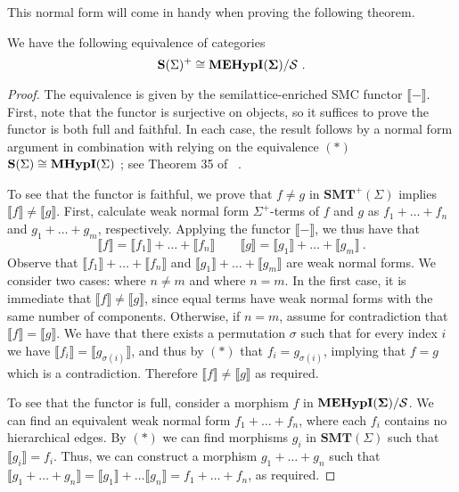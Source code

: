 This normal form will come in handy when proving the following theorem.

\begin{theorem}
\label{thm:completeness_simple}
We have the following equivalence of categories
\[
	\mathbf{S}(\Sigma)^{+} \cong {\mathbf{MEHypI(\Sigma)}} / \mathcal{S}~.
\]	
\end{theorem}
\begin{proof}
The equivalence is given by the semilattice-enriched SMC functor $\llbracket - \rrbracket$.
First, note that the functor is surjective on objects,  so it suffices to prove the functor is both full and faithful.  
In each case,  the result follows by a normal form argument in combination with relying on the equivalence $(*)$ $\mathbf{S}(\Sigma) \cong \textbf{MHypI}(\Sigma)$ 
; see Theorem 35 of ~\cite{bonchi_string_2022-2}.

To see that the functor is faithful,  we prove that $f \neq g$ in $\textbf{SMT}^+(\Sigma)$ implies $\llbracket f \rrbracket \neq \llbracket g \rrbracket$.  
First,  calculate weak normal form $\Sigma^+$-terms of $f$ and $g$ as $f_1 + \ldots + f_n$ and $g_1 + \ldots + g_m$,  respectively.  Applying the functor $\llbracket - \rrbracket$,  we thus have that
\[
	\llbracket f \rrbracket = \llbracket f_1 \rrbracket + \ldots + \llbracket f_n \rrbracket \qquad
	\llbracket g \rrbracket = \llbracket g_1 \rrbracket + \ldots + \llbracket g_m \rrbracket ~ . 
\]
Observe that $\llbracket f_1 \rrbracket + \ldots + \llbracket f_n \rrbracket$ and $\llbracket g_1 \rrbracket + \ldots + \llbracket g_m \rrbracket$ are weak normal forms.  
We consider two cases: where $n \neq m$ and where $n = m$.  
In the first case,  it is immediate that $\llbracket f \rrbracket \neq \llbracket g \rrbracket $,  since equal terms have weak normal forms with the same number of components.  
Otherwise,  if $n = m$,  assume for contradiction that $\llbracket f \rrbracket = \llbracket g \rrbracket$.  
We have that there exists a permutation $\sigma$ such that for every index $i$ we have $\llbracket f_i \rrbracket = \llbracket g_{\sigma(i)} \rrbracket $,  and thus by  $(*)$ that $f_i = g_{\sigma(i)}$,  implying that $f = g$ which is a contradiction.  
Therefore $\llbracket f \rrbracket \neq \llbracket g \rrbracket$ as required. 

To see that the functor is full,  consider a morphism $f$ in ${\mathbf{MEHypI(\Sigma)}} / \mathcal{S}$.  
We can find an equivalent weak normal form $f_1 + \ldots + f_n$,  where each $f_i$ contains no hierarchical edges.  
By $(*)$ we can find morphisms $g_i$ in $\textbf{SMT}(\Sigma)$ such that $\llbracket g_i \rrbracket = f_i$.  
Thus,  we can construct a morphism $g_1 + \ldots + g_n$ such that $\llbracket g_1 + \ldots + g_n \rrbracket = \llbracket g_1 \rrbracket + \ldots \llbracket g_n \rrbracket = f_1 + \ldots + f_n$,  as required. 
\end{proof}

